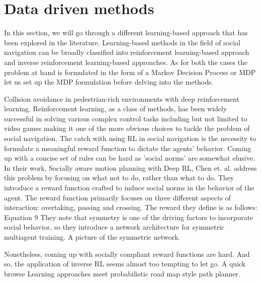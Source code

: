\section{Data driven methods}
In this section, we will go through a different learning-based approach that has been explored in the literature. Learning-based methods in the field of social navigation can be broadly classified into reinforcement learning-based approach and inverse reinforcement learning-based approaches. As for both the cases the problem at hand is formulated in the form of a Markov Decision Process or MDP let us set up the MDP formulation before delving into the methods.



Collision avoidance in pedestrian-rich environments with deep reinforcement learning.
Reinforcement learning, as a class of methods, has been widely successful in solving various complex control tasks including but not limited to video games making it one of the more obvious choices to tackle the problem of social navigation. 
The catch with using RL in social navigation is the necessity to formulate a meaningful reward function to dictate the agents' behavior. Coming up with a concise set of rules can be hard as 'social norms' are somewhat elusive. In their work, Socially aware motion planning with Deep RL, Chen et. al. address this problem by focusing on what not to do, rather than what to do. They introduce a reward function crafted to induce social norms in the behavior of the agent.
The reward function primarily focuses on three different aspects of interaction: overtaking, passing and crossing. The reward they define is as follows:
Equation 9
They note that symmetry is one of the driving factors to incorporate social behavior, so they introduce a network architecture for symmetric multiagent training.
A picture of the symmetric network.


Nonetheless, coming up with socially compliant reward functions are hard. And so, the application of inverse RL seems almost too tempting to let go. A quick browse 
Learning approaches meet probabilistic road map style path planner.



